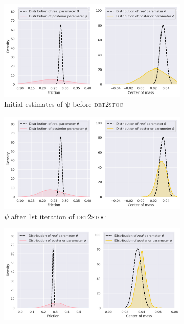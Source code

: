 \documentclass{kththesis}
\newcommand{\vpsi}{\vec{\psi}}
\renewcommand{\vec}[1]{\boldsymbol{#1}}
\newcommand{\dettostoc}{\textsc{det2stoc}}
\begin{document}
\begin{figure}
\centering
{}
\captionsetup{size=footnotesize}
\begin{subfigure}{0.45\textwidth}
  \includegraphics[width=\textwidth]{img/yumi/latent-representation/yumi_latent_encoding_0_iter}%
  \caption{Initial estimates of $\vpsi$ before \dettostoc{}}
\end{subfigure}
\begin{subfigure}{0.45\textwidth}
  \centering
  \includegraphics[width=\linewidth]{img/yumi/latent-representation/yumi_latent_encoding_1_iter}
  \caption{$\psi$ after 1st iteration of \dettostoc{}}
\end{subfigure}
\begin{subfigure}{0.45\textwidth}
  \centering
  \includegraphics[width=\linewidth]{img/yumi/latent-representation/yumi_latent_encoding_2_iter}

\end{subfigure}
\end{figure}
\end{document}
